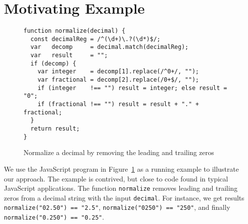 
\section{Motivating Example}\label{sec:mot}

\begin{figure}[tb]
\begin{center}
\begin{verbatim}
function normalize(decimal) {
  const decimalReg = /^(\d+)\.?(\d*)$/;
  var   decomp     = decimal.match(decimalReg);
  var   result     = "";
  if (decomp) {
    var integer    = decomp[1].replace(/^0+/, "");
    var fractional = decomp[2].replace(/0+$/, "");
    if (integer    !== "") result = integer; else result = "0"; 
    if (fractional !== "") result = result + "." + fractional;
  }
  return result;
}
\end{verbatim}
\end{center}
\vspace{-3mm}
\caption{Normalize a decimal by removing the leading and trailing zeros}
\label{fig-run-exmp}
\end{figure}

We use the JavaScript program in Figure~\ref{fig-run-exmp} as a running example to illustrate our approach. The example is
contrived, but close to code found in typical JavaScript
applications.
 The function {\tt normalize}   removes leading and trailing zeros from a decimal string with the input %
{\tt decimal}. For instance, we get results
 \verb!normalize("02.50") == "2.5"!,
 \verb!normalize("0250") == "250"!, and finally
 \verb!normalize("0.250") == "0.25"!.


